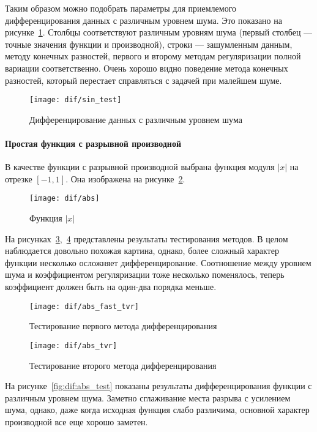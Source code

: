 Таким образом можно подобрать параметры для приемлемого дифференцирования данных с различным уровнем шума. Это показано на рисунке~\ref{fig:dif:sin_test}. Столбцы соответствуют различным уровням шума (первый столбец --- точные значения функции и производной), строки --- зашумленным данным, методу конечных разностей, первого и второму методам регуляризации полной вариации соответственно. Очень хорошо видно поведение метода конечных разностей, который перестает справляться с задачей при малейшем шуме.

\begin{figure}
\texttt{[image: dif/sin\_test]}
\caption{Дифференцирование данных с различным уровнем шума}
\label{fig:dif:sin_test}
\end{figure}

\paragraph{Простая функция с разрывной производной}

В качестве функции с разрывной производной выбрана функция модуля $|x|$ на отрезке $[-1, 1]$. Она изображена на рисунке~\ref{fig:dif:abs}.

\begin{figure}
\texttt{[image: dif/abs]}
\caption{Функция $|x|$}
\label{fig:dif:abs}
\end{figure}

На рисунках~\ref{fig:dif:abs_fast_tvr},~\ref{fig:dif:abs_tvr} представлены результаты тестирования методов. В целом наблюдается довольно похожая картина, однако, более сложный характер функции несколько осложняет дифференцирование. Соотношение между уровнем шума и коэффициентом регуляризации тоже несколько поменялось, теперь коэффициент должен быть на один-два порядка меньше.

\begin{figure}
\texttt{[image: dif/abs\_fast\_tvr]}
\caption{Тестирование первого метода дифференцирования}
\label{fig:dif:abs_fast_tvr}
\end{figure}

\begin{figure}
\texttt{[image: dif/abs\_tvr]}
\caption{Тестирование второго метода дифференцирования}
\label{fig:dif:abs_tvr}
\end{figure}

На рисунке~\ref{fig:dif:abs_test} показаны результаты дифференцирования функции с различным уровнем шума. Заметно сглаживание места разрыва с усилением шума, однако, даже когда исходная функция слабо различима, основной характер производной все еще хорошо заметен.

